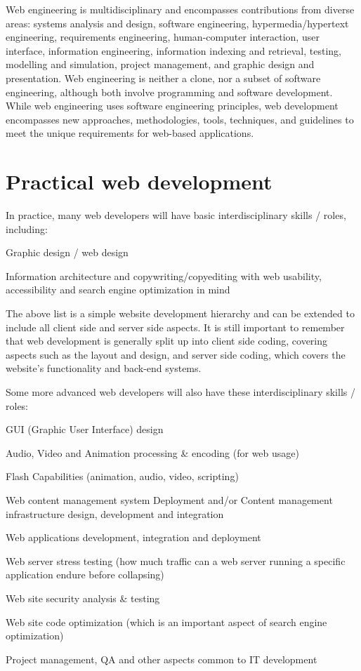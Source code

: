 Web engineering is multidisciplinary and encompasses contributions from diverse areas: systems analysis and design, software engineering, hypermedia/hypertext engineering, requirements engineering, human-computer interaction, user interface, information engineering, information indexing and retrieval, testing, modelling and simulation, project management, and graphic design and presentation. Web engineering is neither a clone, nor a subset of software engineering, although both involve programming and software development. While web engineering uses software engineering principles, web development encompasses new approaches, methodologies, tools, techniques, and guidelines to meet the unique requirements for web-based applications.


\chapter{Practical web development}


In practice, many web developers will have basic interdisciplinary skills / roles, including:

\begin{compactitem}
\item Graphic design / web design
\item Information architecture and copywriting/copyediting with web usability, accessibility and search engine optimization in mind
\end{compactitem}


The above list is a simple website development hierarchy and can be extended to include all client side and server side aspects. It is still important to remember that web development is generally split up into client side coding, covering aspects such as the layout and design, and server side coding, which covers the website's functionality and back-end systems.

Some more advanced web developers will also have these interdisciplinary skills / roles:

\begin{compactitem}
\item GUI (Graphic User Interface) design
\item Audio, Video and Animation processing \& encoding (for web usage)
\item Flash Capabilities (animation, audio, video, scripting)
\item Web content management system Deployment and/or Content management infrastructure design, development and integration
\item Web applications development, integration and deployment
\item Web server stress testing (how much traffic can a web server running a specific application endure before collapsing)
\item Web site security analysis \& testing
\item Web site code optimization (which is an important aspect of search engine optimization)
\item Project management, QA and other aspects common to IT development
\end{compactitem}


